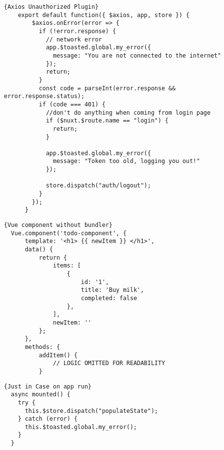 \begin{lstlisting}[caption=Axios Unauthorized Plugin, captionpos=b, style=htmlcssjs, label=unauthorized]{Axios Unauthorized Plugin}
    export default function({ $axios, app, store }) {
        $axios.onError(error => {
          if (!error.response) {
            // network error
            app.$toasted.global.my_error({
              message: "You are not connected to the internet"
            });
            return;
          }
          const code = parseInt(error.response && error.response.status);
          if (code === 401) {
            //don't do anything when coming from login page
            if ($nuxt.$route.name == "login") {
              return;
            }
      
            app.$toasted.global.my_error({
              message: "Token too old, logging you out!"
            });
      
            store.dispatch("auth/logout");
          }
        });
      }
\end{lstlisting}


\begin{lstlisting}[caption=Vue component without bundler, captionpos=b, style=htmlcssjs, label=compwobundler]{Vue component without bundler}
  Vue.component('todo-component', {
      template: '<h1> {{ newItem }} </h1>',
      data() {
          return {
              items: [
                  {
                      id: '1',
                      title: 'Buy milk',
                      completed: false
                  },
              ],
              newItem: ''
          };
      },
      methods: {
          addItem() {
              // LOGIC OMITTED FOR READABILITY
          }
  \end{lstlisting}

\begin{lstlisting}[caption=Just in Case on app run, captionpos=b, style=htmlcssjs, label=jic]{Just in Case on app run}
  async mounted() {
    try {
      this.$store.dispatch("populateState");
    } catch (error) {
      this.$toasted.global.my_error();
    }
  }
\end{lstlisting}

